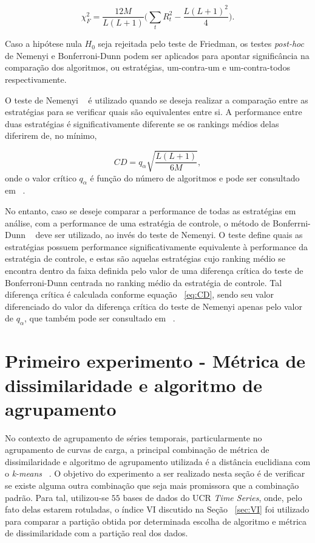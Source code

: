 \begin{equation}
\chi_{F}^{2}=\frac{12M}{L(L+1)}\bigg(\sum_{t}^{} R_t^2 - \frac{L(L+1)^2}{4} \bigg).
\end{equation}

Caso a hipótese nula $H_0$ seja rejeitada pelo teste de Friedman, os testes \emph{post-hoc} de Nemenyi e Bonferroni-Dunn podem ser aplicados para apontar significância na comparação dos algoritmos, ou estratégias, um-contra-um e um-contra-todos respectivamente.

O teste de Nemenyi ~\parencite{Nem63} é utilizado quando se deseja realizar a comparação entre as estratégias para se verificar quais são equivalentes entre si. A performance entre duas estratégias é significativamente diferente se os rankings médios delas diferirem de, no mínimo,

\begin{equation} \label{eq:CD}
	CD = q_{\alpha}\sqrt{\frac{L(L+1)}{6M}}, 
\end{equation}
onde o valor crítico $q_{\alpha}$ é função do número de algoritmos e pode ser consultado em ~\parencite{Demsar}.

No entanto, caso se deseje comparar a performance de todas as estratégias em análise, com a performance de uma estratégia de controle, o método de Bonferrni-Dunn ~\parencite{bonferroni_dunn} deve ser utilizado, ao invés do teste de Nemenyi. O teste define quais as estratégias possuem performance significativamente equivalente à performance da estratégia de controle, e estas são aquelas estratégias cujo ranking médio se encontra dentro da faixa definida pelo valor de uma diferença crítica do teste de Bonferroni-Dunn centrada no ranking médio da estratégia de controle. Tal diferença crítica é calculada conforme equação ~\ref{eq:CD}, sendo seu valor diferenciado do valor da diferença crítica do teste de Nemenyi apenas pelo valor de $q_{\alpha}$, que também pode ser consultado em ~\parencite{Demsar}.

\section{Primeiro experimento - Métrica de dissimilaridade e algoritmo de agrupamento}

No contexto de agrupamento de séries temporais, particularmente no agrupamento de curvas de carga, a principal combinação de métrica de dissimilaridade e algoritmo de agrupamento utilizada é a distância euclidiana com o \emph{k-means} ~\parencite{Chicco}. O objetivo do experimento a ser realizado nesta seção é de verificar se existe alguma outra combinação que seja mais promissora que a combinação padrão. Para tal, utilizou-se $55$ bases de dados do UCR \emph{Time Series}, onde, pelo fato delas estarem rotuladas, o índice VI discutido na Seção ~\ref{sec:VI} foi utilizado para comparar a partição obtida por determinada escolha de algoritmo e métrica de dissimilaridade com a partição real dos dados.


